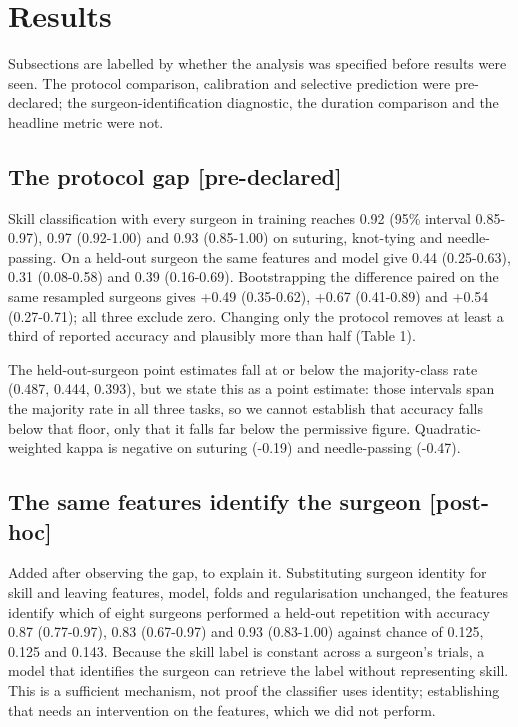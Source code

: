 \section{Results}

Subsections are labelled by whether the analysis was specified before results were seen. The protocol comparison, calibration and selective prediction were pre-declared; the surgeon-identification diagnostic, the duration comparison and the headline metric were not.

\subsection{The protocol gap [pre-declared]}

Skill classification with every surgeon in training reaches 0.92 (95\% interval 0.85-0.97), 0.97 (0.92-1.00) and 0.93 (0.85-1.00) on suturing, knot-tying and needle-passing. On a held-out surgeon the same features and model give 0.44 (0.25-0.63), 0.31 (0.08-0.58) and 0.39 (0.16-0.69). Bootstrapping the difference paired on the same resampled surgeons gives +0.49 (0.35-0.62), +0.67 (0.41-0.89) and +0.54 (0.27-0.71); all three exclude zero. Changing only the protocol removes at least a third of reported accuracy and plausibly more than half (Table 1).

The held-out-surgeon point estimates fall at or below the majority-class rate (0.487, 0.444, 0.393), but we state this as a point estimate: those intervals span the majority rate in all three tasks, so we cannot establish that accuracy falls below that floor, only that it falls far below the permissive figure. Quadratic-weighted kappa is negative on suturing (-0.19) and needle-passing (-0.47).

\subsection{The same features identify the surgeon [post-hoc]}

Added after observing the gap, to explain it. Substituting surgeon identity for skill and leaving features, model, folds and regularisation unchanged, the features identify which of eight surgeons performed a held-out repetition with accuracy 0.87 (0.77-0.97), 0.83 (0.67-0.97) and 0.93 (0.83-1.00) against chance of 0.125, 0.125 and 0.143. Because the skill label is constant across a surgeon's trials, a model that identifies the surgeon can retrieve the label without representing skill. This is a sufficient mechanism, not proof the classifier uses identity; establishing that needs an intervention on the features, which we did not perform.

